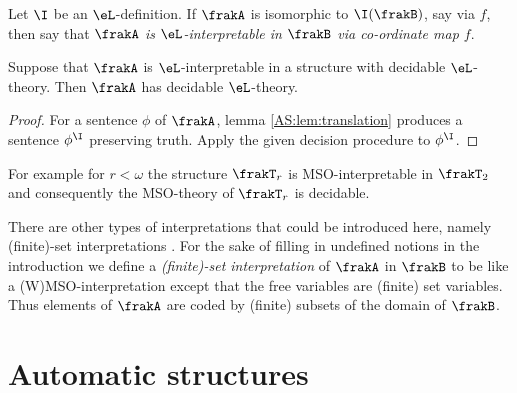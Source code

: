 \begin{definition}
Let $\I$ be an $\eL$-definition. If $\frakA$ is isomorphic to $\I(\frakB)$, say via $f$, then say that {\em $\frakA$ is  $\eL$-interpretable in $\frakB$ via co-ordinate map $f$}.
\end{definition}

\begin{proposition}
Suppose that $\frakA$ is $\eL$-interpretable in a structure with decidable $\eL$-theory. Then $\frakA$ has decidable $\eL$-theory.
\end{proposition}

\begin{proof}
For a sentence $\phi$ of $\frakA$, lemma \ref{AS:lem:translation} produces a sentence $\phi^\I$ preserving truth. 
Apply the given decision procedure to $\phi^\I$. 
\end{proof}

For example  for $r < \omega$ the structure $\frakT_r$ is MSO-interpretable in $\frakT_2$ and consequently the MSO-theory of $\frakT_r$ is decidable.

There are other types of interpretations that could be introduced here, namely
(finite)-set interpretations \cite{ElRa66} \cite{CoLo07}.  For the sake
of filling in undefined notions in the introduction we define a {\em (finite)-set
interpretation} of $\frakA$ in $\frakB$ to be like a (W)MSO-interpretation except
that the free variables are (finite) set
variables. Thus elements of $\frakA$ are coded by (finite) subsets of the domain
of $\frakB$.

\iffalse
?? ALT DFN ??

\begin{definition}
\begin{enumerate}
\item A structure FO-interpretable in $\Power_f(\frakT_1)$ is called {\em finite-string automatic}.
\item A structure FO-interpretable in $\Power(\frakT_1)$ is called {\em $\omega$-string automatic}.
\item A structure FO-interpretable in $\Power_f(\frakT_2)$ is called {\em finite-tree automatic}.
\item A structure FO-interpretable in $\Power(\frakT_2)$ is called {\em $\omega$-tree automatic}.
\end{enumerate}
\end{definition}
\fi
\section{Automatic structures} \label{AS:sec:autstr}

